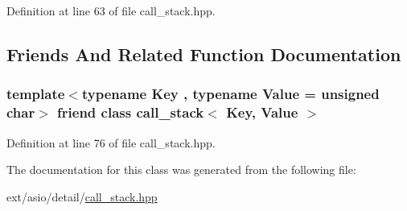 Definition at line 63 of file call\+\_\+stack.\+hpp.



\subsection{Friends And Related Function Documentation}
\hypertarget{classasio_1_1detail_1_1call__stack_1_1context_a3bc7e70c9cc3b79c5256516316cc3ea9}{}
\subsubsection[{call\+\_\+stack$<$ Key, Value $>$}]{\setlength{\rightskip}{0pt plus 5cm}template$<$typename Key , typename Value  = unsigned char$>$ friend class {\bf call\+\_\+stack}$<$ Key, Value $>$\hspace{0.3cm}{\ttfamily [friend]}}\label{classasio_1_1detail_1_1call__stack_1_1context_a3bc7e70c9cc3b79c5256516316cc3ea9}


Definition at line 76 of file call\+\_\+stack.\+hpp.



The documentation for this class was generated from the following file\+:\begin{DoxyCompactItemize}
\item 
ext/asio/detail/\hyperlink{call__stack_8hpp}{call\+\_\+stack.\+hpp}\end{DoxyCompactItemize}
